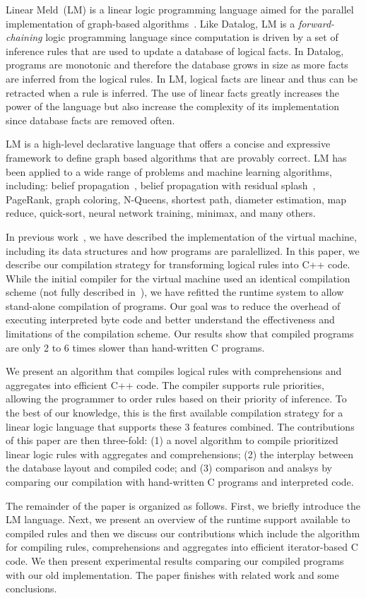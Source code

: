 Linear Meld~(LM) is a linear logic programming language
aimed for the parallel implementation of graph-based
algorithms~\cite{cruz-iclp14}. Like Datalog, LM is
a \emph{forward-chaining} logic programming language since computation is driven by a set of
inference rules that are used to update a database of logical facts. In Datalog,
programs are monotonic and therefore the database grows in size as more facts are
inferred from the logical rules. In LM, logical
facts are linear and thus can be retracted when a rule is inferred. The use of linear
facts greatly increases the power of the language but also increase the
complexity of its implementation since database facts are removed often.

LM is a high-level declarative language that offers a concise and
expressive framework to define graph based algorithms that are provably correct.
LM has been applied to a wide range of problems and machine learning
algorithms, including: belief propagation~\cite{Gonzalez+al:aistats09paraml},
belief propagation with residual splash~\cite{Gonzalez+al:aistats09paraml},
PageRank, graph coloring, N-Queens, shortest path, diameter estimation,
map reduce, quick-sort, neural network training, minimax, and many others.

In previous work~\cite{cruz-ppdp14}, we have described the implementation of the
virtual machine, including its data structures and how programs are
paralellized. In this paper, we describe our compilation strategy for
transforming logical rules into C++ code. While the initial compiler for the virtual
machine used an identical compilation scheme (not fully described
in~\cite{cruz-ppdp14}), we have refitted the runtime system to allow
stand-alone compilation of programs. Our goal was to reduce the overhead of executing
interpreted byte code and better understand the effectiveness and limitations of the
compilation scheme. Our results show that compiled programs are only 2 to 6
times slower than hand-written C programs.

We present an algorithm that compiles logical rules with comprehensions and
aggregates into efficient C++ code. The compiler supports rule priorities, allowing
the programmer to order rules based on their priority of inference. To the best
of our knowledge, this is the first available compilation strategy for a linear logic
language that supports these 3 features combined. The
contributions of this paper are then three-fold: (1) a novel algorithm to compile
prioritized linear logic rules with aggregates and comprehensions; (2) the
interplay between the database layout and compiled code; and (3) comparison and
analsys by comparing our compilation with
hand-written C programs and interpreted code.

The remainder of the paper is organized as follows. First, we briefly introduce
the LM language. Next, we present an overview of the runtime support available
to compiled rules and then we discuss our contributions which include the
algorithm for compiling rules, comprehensions and aggregates into efficient
iterator-based C code. We then present experimental results comparing our
compiled programs with our old implementation. The paper finishes with related
work and some conclusions.
